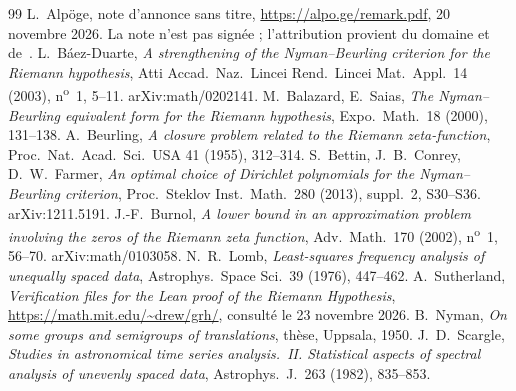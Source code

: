 \documentclass[11pt,a4paper]{amsart}
\theoremstyle{definition}
\theoremstyle{remark}
\begin{document}
\begin{thebibliography}{99}
 L.~Alp\"oge, note d'annonce sans titre, \url{https://alpo.ge/remark.pdf}, 20 novembre 2026. La note n'est pas sign\'ee ; l'attribution provient du domaine et de~\cite{MIT}.
 L.~B\'aez-Duarte, \emph{A strengthening of the Nyman--Beurling criterion for the Riemann hypothesis}, Atti Accad.\ Naz.\ Lincei Rend.\ Lincei Mat.\ Appl.\ 14 (2003), n\textsuperscript{o}~1, 5--11. {\NoAutoSpacing arXiv:math/0202141}.
 M.~Balazard, E.~Saias, \emph{The Nyman--Beurling equivalent form for the Riemann hypothesis}, Expo.\ Math.\ 18 (2000), 131--138.
 A.~Beurling, \emph{A closure problem related to the Riemann zeta-function}, Proc.\ Nat.\ Acad.\ Sci.\ USA 41 (1955), 312--314.
 S.~Bettin, J.~B.~Conrey, D.~W.~Farmer, \emph{An optimal choice of Dirichlet polynomials for the Nyman--Beurling criterion}, Proc.\ Steklov Inst.\ Math.\ 280 (2013), suppl.~2, S30--S36. {\NoAutoSpacing arXiv:1211.5191}.
 J.-F.~Burnol, \emph{A lower bound in an approximation problem involving the zeros of the Riemann zeta function}, Adv.\ Math.\ 170 (2002), n\textsuperscript{o}~1, 56--70. {\NoAutoSpacing arXiv:math/0103058}.
 N.~R.~Lomb, \emph{Least-squares frequency analysis of unequally spaced data}, Astrophys.\ Space Sci.\ 39 (1976), 447--462.
 A.~Sutherland, \emph{Verification files for the Lean proof of the Riemann Hypothesis}, \url{https://math.mit.edu/~drew/grh/}, consult\'e le 23 novembre 2026.
 B.~Nyman, \emph{On some groups and semigroups of translations}, th\`ese, Uppsala, 1950.
 J.~D.~Scargle, \emph{Studies in astronomical time series analysis.~II. Statistical aspects of spectral analysis of unevenly spaced data}, Astrophys.\ J.\ 263 (1982), 835--853.
\end{thebibliography}
\end{document}
